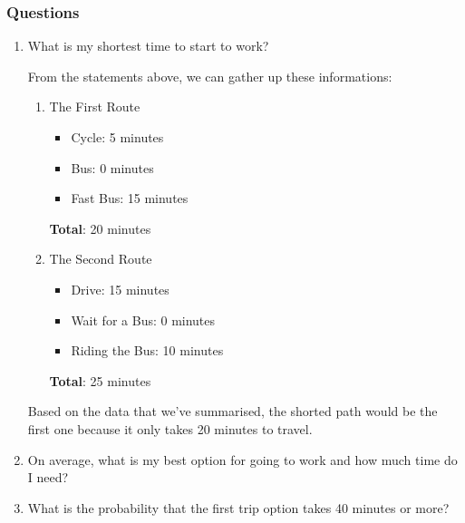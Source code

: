 \documentclass[12pt,titlepage]{article}
\begin{document}
\subsubsection*{Questions}
\begin{enumerate}
    \item {
        What is my shortest time to start to work?

        From the statements above, we can gather up these informations:
        \begin{enumerate}
            \item {
                The First Route
                \begin{itemize}
                    \item Cycle: 5 minutes
                    \item Bus: 0 minutes
                    \item Fast Bus: 15 minutes
                \end{itemize}
                \textbf{Total}: 20 minutes
                }
                \item {
                    The Second Route
                    \begin{itemize}
                        \item Drive: 15 minutes
                        \item Wait for a Bus: 0 minutes
                        \item Riding the Bus: 10 minutes
                    \end{itemize}
                \textbf{Total}: 25 minutes
            }
        \end{enumerate}
        Based on the data that we've summarised, the shorted path would be the first one because it only takes 20 minutes to travel.
    }
    \pagebreak
    \item {
        On average, what is my best option for going to work and how much time do I need?
    }
    \item {
        What is the probability that the first trip option takes 40 minutes or more?
    }
\end{enumerate}
\end{document}
